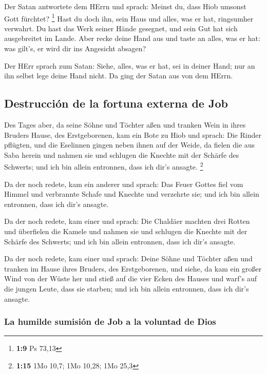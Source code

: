  Der Satan antwortete dem HErrn und sprach: Meinst du,
dass Hiob umsonst Gott fürchtet? \footnote{\textbf{1:9} Ps 73,13}
 Hast du doch ihn, sein Haus und alles, was er hat,
ringsumher verwahrt. Du hast das Werk seiner Hände gesegnet, und sein
Gut hat sich ausgebreitet im Lande.  Aber recke deine
Hand aus und taste an alles, was er hat: was gilt's, er wird dir ins
Angesicht absagen?

 Der HErr sprach zum Satan: Siehe, alles, was er hat, sei
in deiner Hand; nur an ihn selbst lege deine Hand nicht. Da ging der
Satan aus von dem HErrn.

\hypertarget{destrucciuxf3n-de-la-fortuna-externa-de-job}{%
\subsection{Destrucción de la fortuna externa de
Job}\label{destrucciuxf3n-de-la-fortuna-externa-de-job}}

 Des Tages aber, da seine Söhne und Töchter aßen und
tranken Wein in ihres Bruders Hause, des Erstgeborenen, 
kam ein Bote zu Hiob und sprach: Die Rinder pflügten, und die Eselinnen
gingen neben ihnen auf der Weide,  da fielen die aus Saba
herein und nahmen sie und schlugen die Knechte mit der Schärfe des
Schwerts; und ich bin allein entronnen, dass ich dir's ansagte.
\footnote{\textbf{1:15} 1Mo 10,7; 1Mo 10,28; 1Mo 25,3}

 Da der noch redete, kam ein anderer und sprach: Das
Feuer Gottes fiel vom Himmel und verbrannte Schafe und Knechte und
verzehrte sie; und ich bin allein entronnen, dass ich dir's ansagte.

 Da der noch redete, kam einer und sprach: Die Chaldäer
machten drei Rotten und überfielen die Kamele und nahmen sie und
schlugen die Knechte mit der Schärfe des Schwerts; und ich bin allein
entronnen, dass ich dir's ansagte.

 Da der noch redete, kam einer und sprach: Deine Söhne
und Töchter aßen und tranken im Hause ihres Bruders, des Erstgeborenen,
 und siehe, da kam ein großer Wind von der Wüste her und
stieß auf die vier Ecken des Hauses und warf's auf die jungen Leute,
dass sie starben; und ich bin allein entronnen, dass ich dir's ansagte.

\hypertarget{la-humilde-sumisiuxf3n-de-job-a-la-voluntad-de-dios}{%
\subsubsection{La humilde sumisión de Job a la voluntad de
Dios}\label{la-humilde-sumisiuxf3n-de-job-a-la-voluntad-de-dios}}

